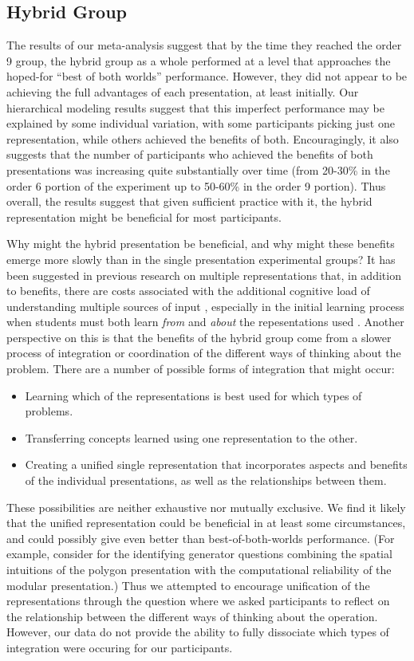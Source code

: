 \documentclass[man,10pt]{apa6}
\begin{document}
\subsection{Hybrid Group}
The results of our meta-analysis suggest that by the time they reached the order 9 group, the hybrid group as a whole performed at a level that approaches the hoped-for ``best of both worlds'' performance. However, they did not appear to be achieving the full advantages of each presentation, at least initially. Our hierarchical modeling results suggest that this imperfect performance may be explained by some individual variation, with some participants picking just one representation, while others achieved the benefits of both. Encouragingly, it also suggests that the number of participants who achieved the benefits of both presentations was increasing quite substantially over time (from 20-30\% in the order 6 portion of the experiment up to 50-60\% in the order 9 portion). Thus overall, the results suggest that given sufficient practice with it, the hybrid representation might be beneficial for most participants.\par 
Why might the hybrid presentation be beneficial, and why might these benefits emerge more slowly than in the single presentation experimental groups? It has been suggested in previous research on multiple representations that, in addition to benefits, there are costs associated with the additional cognitive load of understanding multiple sources of input \cite{Ainsworth2006}, especially in the initial learning process when students must both learn \emph{from} and \emph{about} the repesentations used \cite{Rau2016}. Another perspective on this is that the benefits of the hybrid group come from a slower process of integration or coordination \cite{Schwartz2015} of the different ways of thinking about the problem. There are a number of possible forms of integration that might occur:
\begin{itemize}
\item Learning which of the representations is best used for which types of problems. 
\item Transferring concepts learned using one representation to the other.
\item Creating a unified single representation that incorporates aspects and benefits of the individual presentations, as well as the relationships between them.  
\end{itemize} 
These possibilities are neither exhaustive nor mutually exclusive. We find it likely that the unified representation could be beneficial in at least some circumstances, and could possibly give even better than best-of-both-worlds performance. (For example, consider for the identifying generator questions combining the spatial intuitions of the polygon presentation with the computational reliability of the modular presentation.) Thus we attempted to encourage unification of the representations through the question where we asked participants to reflect on the relationship between the different ways of thinking about the operation. However, our data do not provide the ability to fully dissociate which types of integration were occuring for our participants. \par
\end{document}
